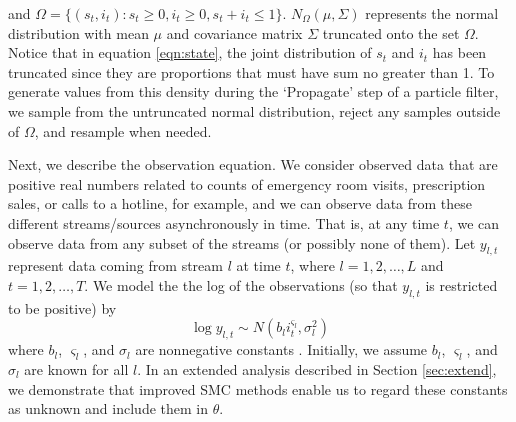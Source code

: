 \documentclass{elsarticle}
\begin{document}
\noindent and $\Omega = \{(s_t,i_t): s_t \ge 0, i_t \ge 0, s_t + i_t \le 1\}$. $N_{\Omega}(\mu,\Sigma)$ represents the normal distribution with mean $\mu$ and covariance matrix $\Sigma$ truncated onto the set $\Omega$. Notice that in equation \eqref{eqn:state}, the joint distribution of $s_t$ and $i_t$ has been truncated since they are proportions that must have sum no greater than 1. To generate values from this density during the `Propagate' step of a particle filter, we sample from the untruncated normal distribution, reject any samples outside of $\Omega$, and resample when needed.

%


Next, we describe the observation equation. We consider observed data that are positive real numbers related to counts of emergency room visits, prescription sales, or calls to a hotline, for example, and we can observe data from these different streams/sources asynchronously in time. That is, at any time $t$, we can observe data from any subset of the streams (or possibly none of them). Let $y_{l,t}$ represent data coming from stream $l$ at time $t$, where $l = 1,2,\ldots,L$ and $t = 1,2,\ldots,T$. We model the the log of the observations (so that $y_{l,t}$ is restricted to be positive) by
\begin{equation}
\log y_{l,t} \sim N\left(b_li_t^{\varsigma_l},\sigma_l^2\right) \label{eqn:obs}
\end{equation}
where $b_l$, $\varsigma_l$, and $\sigma_l$ are nonnegative constants \citep{skvortsov2012monitoring}. Initially, we assume $b_l$, $\varsigma_l$, and $\sigma_l$ are known for all $l$. In an extended analysis described in Section \ref{sec:extend}, we demonstrate that improved SMC methods enable us to regard these constants as unknown and include them in $\theta$.
\end{document}
